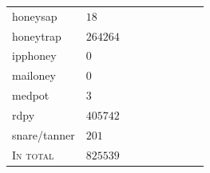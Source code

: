 \begin{table}
\begin{tabularx}{\linewidth}{l|XX|XXXXXX}
        honeysap \cite{honeysap2021}             & $18$                                  &                                          &                                 &                                    &                 &                     &                 &                     \\
        honeytrap \cite{honeytrap2021}           & $264264$                              &                                          &                                 &                                    &                 &                     &                 &                     \\
        ipphoney \cite{ipphoney2021}             & $0$                                   &                                          &                                 &                                    &                 &                     &                 &                     \\
        mailoney                                 & $0$                                   &                                          &                                 &                                    &                 &                     &                 &                     \\
        medpot \cite{medpot2021}                 & $3$                                   &                                          &                                 &                                    &                 &                     &                 &                     \\
        rdpy \cite{rdpy2021}                     & $405742$                              &                                          &                                 &                                    &                 &                     &                 &                     \\
        snare/tanner \cite{snare2021}            & $201$                                 &                                          &                                 &                                    &                 &                     &                 &                     \\
        \hline
        \textsc{In total}                        & $825539$                              &                                          &                                 &                                    &                 &                     &                 &                     \\
        \bottomrule
    \end{tabularx}
    \label{tab:overview-honeypots-attacks}
\end{table}

